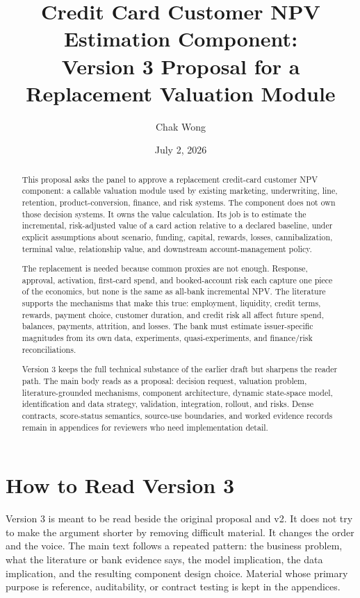 \documentclass[11pt]{article}
\title{Credit Card Customer NPV Estimation Component:\\
Version 3 Proposal for a Replacement Valuation Module}
\author{Chak Wong}
\date{July 2, 2026}
\newcommand{\1}{\mathbf{1}}
\begin{document}
\maketitle

\begin{abstract}
This proposal asks the panel to approve a replacement credit-card customer NPV
component: a callable valuation module used by existing marketing,
underwriting, line, retention, product-conversion, finance, and risk systems.
The component does not own those decision systems. It owns the value
calculation. Its job is to estimate the incremental, risk-adjusted value of a
card action relative to a declared baseline, under explicit assumptions about
scenario, funding, capital, rewards, losses, cannibalization, terminal value,
relationship value, and downstream account-management policy.

The replacement is needed because common proxies are not enough. Response,
approval, activation, first-card spend, and booked-account risk each capture
one piece of the economics, but none is the same as all-bank incremental NPV.
The literature supports the mechanisms that make this true: employment,
liquidity, credit terms, rewards, payment choice, customer duration, and credit
risk all affect future spend, balances, payments, attrition, and losses. The
bank must estimate issuer-specific magnitudes from its own data, experiments,
quasi-experiments, and finance/risk reconciliations.

Version 3 keeps the full technical substance of the earlier draft but sharpens
the reader path. The main body reads as a proposal: decision request, valuation
problem, literature-grounded mechanisms, component architecture, dynamic
state-space model, identification and data strategy, validation, integration,
rollout, and risks. Dense contracts, score-status semantics, source-use
boundaries, and worked evidence records remain in appendices for reviewers who
need implementation detail.
\end{abstract}

\section*{How to Read Version 3}

Version 3 is meant to be read beside the original proposal and v2. It does not
try to make the argument shorter by removing difficult material. It changes the
order and the voice. The main text follows a repeated pattern: the business
problem, what the literature or bank evidence says, the model implication, the
data implication, and the resulting component design choice. Material whose
primary purpose is reference, auditability, or contract testing is kept in the
appendices.
\end{document}

